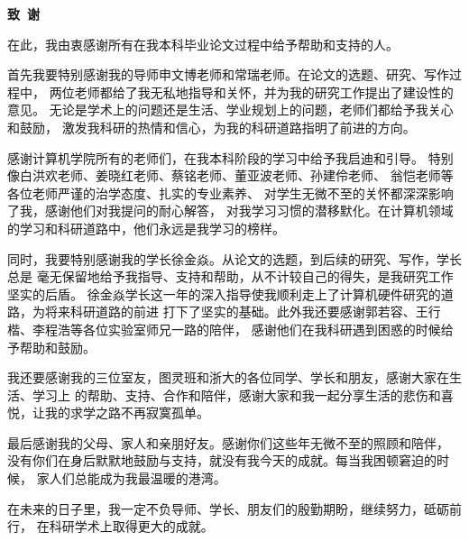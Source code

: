 \cleardoublepage{}
\begin{center}
    \bfseries {} 致~谢
\end{center}

在此，我由衷感谢所有在我本科毕业论文过程中给予帮助和支持的人。\par

首先我要特别感谢我的导师申文博老师和常瑞老师。在论文的选题、研究、写作过程中，
两位老师都给了我无私地指导和关怀，并为我的研究工作提出了建设性的意见。
无论是学术上的问题还是生活、学业规划上的问题，老师们都给予我关心和鼓励，
激发我科研的热情和信心，为我的科研道路指明了前进的方向。\par

感谢计算机学院所有的老师们，在我本科阶段的学习中给予我启迪和引导。
特别像白洪欢老师、姜晓红老师、蔡铭老师、董亚波老师、孙建伶老师、
翁恺老师等各位老师严谨的治学态度、扎实的专业素养、
对学生无微不至的关怀都深深影响了我，感谢他们对我提问的耐心解答，
对我学习习惯的潜移默化。在计算机领域的学习和科研道路中，他们永远是我学习的榜样。\par

同时，我要特别感谢我的学长徐金焱。从论文的选题，到后续的研究、写作，学长总是
毫无保留地给予我指导、支持和帮助，从不计较自己的得失，是我研究工作坚实的后盾。
徐金焱学长这一年的深入指导使我顺利走上了计算机硬件研究的道路，为将来科研道路的前进
打下了坚实的基础。此外我还要感谢郭若容、王行楷、李程浩等各位实验室师兄一路的陪伴，
感谢他们在我科研遇到困惑的时候给予帮助和鼓励。\par

我还要感谢我的三位室友，图灵班和浙大的各位同学、学长和朋友，感谢大家在生活、学习上
的帮助、支持、合作和陪伴，感谢大家和我一起分享生活的悲伤和喜悦，让我的求学之路不再寂寞孤单。\par

最后感谢我的父母、家人和亲朋好友。感谢你们这些年无微不至的照顾和陪伴，
没有你们在身后默默地鼓励与支持，就没有我今天的成就。每当我困顿窘迫的时候，
家人们总能成为我最温暖的港湾。\par

在未来的日子里，我一定不负导师、学长、朋友们的殷勤期盼，继续努力，砥砺前行，
在科研学术上取得更大的成就。\par
